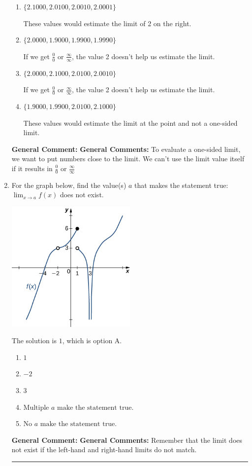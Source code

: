 \documentclass{extbook}[14pt]
\newcommand{\litem}[1]{\item #1

\rule{\textwidth}{0.4pt}}
\begin{document}
\begin{enumerate}
{\begin{enumerate}[label=\Alph*.]
This is correct!
\item \( \{ 2.1000, 2.0100, 2.0010, 2.0001 \} \)

These values would estimate the limit of 2 on the right.
\item \( \{ 2.0000, 1.9000, 1.9900, 1.9990 \} \)

If we get $\frac{0}{0}$ or $\frac{\infty}{\infty}$, the value 2 doesn't help us estimate the limit.
\item \( \{ 2.0000, 2.1000, 2.0100, 2.0010 \} \)

If we get $\frac{0}{0}$ or $\frac{\infty}{\infty}$, the value 2 doesn't help us estimate the limit.
\item \( \{ 1.9000, 1.9900, 2.0100, 2.1000 \} \)

These values would estimate the limit at the point and not a one-sided limit.
\end{enumerate}

\textbf{General Comment:} \textbf{General Comments:} To evaluate a one-sided limit, we want to put numbers close to the limit. We can't use the limit value itself if it results in $\frac{0}{0}$ or $\frac{\infty}{\infty}$
}
\litem{
For the graph below, find the value(s) $a$ that makes the statement true: $ \displaystyle \lim_{x \rightarrow a} f(x)$ does not exist.

\begin{center}
    \includegraphics[width=0.5\textwidth]{../Figures/evaluateLimitGraphicallyCopyC.png}
\end{center}


The solution is \( 1 \), which is option A.\begin{enumerate}[label=\Alph*.]
\item \( 1 \)


\item \( -2 \)


\item \( 3 \)


\item \( \text{Multiple } a \text{ make the statement true}. \)


\item \( \text{No } a \text{ make the statement true}. \)


\end{enumerate}

\textbf{General Comment:} \textbf{General Comments:} Remember that the limit does not exist if the left-hand and right-hand limits do not match.
}
\end{enumerate}
\end{document}
